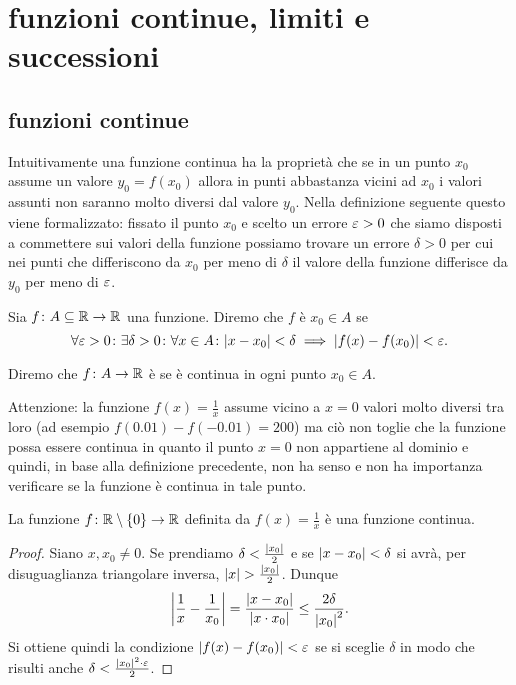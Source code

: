 \chapter{funzioni continue, limiti e successioni}

\section{funzioni continue}
\label{sec:continuita}

Intuitivamente una funzione continua ha la proprietà
che se in un punto $x_0$ assume un valore $y_0=f(x_0)$ allora
in punti abbastanza vicini ad $x_0$ i valori assunti
non saranno molto diversi dal valore $y_0$.
Nella definizione seguente questo viene formalizzato:
fissato il punto $x_0$ e scelto un errore $\varepsilon>0$
che siamo disposti a commettere sui valori della funzione
possiamo trovare un errore $\delta>0$ per cui nei punti
che differiscono da $x_0$ per meno di $\delta$ il valore
della funzione differisce da $y_0$ per meno di $\varepsilon$.

\begin{definition}[continuità su $\RR$]
\label{def:continua}%
%
%
Sia $f\colon A \subseteq \mathbb R \to \mathbb R$ una funzione. Diremo che
$f$ è  $x_0\in A$ se
\begin{equation}\label{eq:continuita}
\forall \varepsilon>0 \colon \exists \delta>0 \colon
\forall x\in A\colon
{\left|x-x_0\right|} < \delta \implies {\left|f(x)-f(x_0)\right|} < \varepsilon.
\end{equation}

Diremo che $f\colon A \to \mathbb R$ 
è  se è continua in ogni punto $x_0 \in A$.
\end{definition}


Attenzione: la funzione $f(x)=\frac{1}{x}$
assume vicino a $x=0$ valori molto diversi tra loro (ad esempio $f(0.01)-f(-0.01)=200$)
ma ciò non toglie che la funzione possa essere continua in quanto il punto
$x=0$ non appartiene al dominio e quindi,
in base alla definizione precedente, non ha senso e non ha importanza
verificare se la funzione è continua in tale punto.

\begin{theorem}
\label{th:cont_reciproco}%
La funzione $f\colon \mathbb R\setminus{\left\{ 0 \right\}}\to \mathbb R$ definita
da $f(x)=\frac 1 x$ è una funzione continua.
\end{theorem}
%
\begin{proof}
Siano $x,x_0\neq 0$.
Se prendiamo $\delta < \frac{{\left|x_0\right|}}2$
e se ${\left|x-x_0\right|} < \delta$ si avrà,
per disuguaglianza triangolare inversa,
${\left|x\right|} > \frac{{\left|x_0\right|}}2$. Dunque
\[
{\left|\frac 1 x - \frac 1 {x_0}\right|}
= \frac{{\left|x-x_0\right|}}{{\left|x\cdot x_0\right|}}
\le \frac{2\delta}{{\left|x_0\right|}^2}.
\]
Si ottiene quindi la condizione ${\left|f(x)-f(x_0)\right|}<\varepsilon$
se si sceglie $\delta$ in modo che
risulti anche $\delta < \frac{{\left|x_0\right|}^2\cdot \varepsilon}{2}$.
\end{proof}

